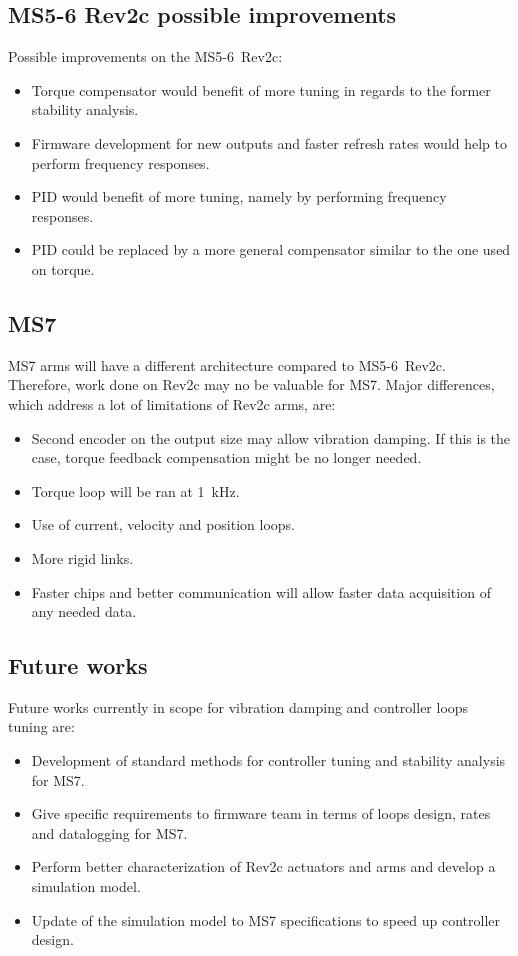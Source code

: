 \subsection{MS5-6 Rev2c possible improvements}
Possible improvements on the MS5-6~Rev2c:
\begin{itemize}
	\item Torque compensator would benefit of more tuning in regards to the former stability analysis.
	\item Firmware development for new outputs and faster refresh rates would help to perform frequency responses.
	\item PID would benefit of more tuning, namely by performing frequency responses.
	\item PID could be replaced by a more general compensator similar to the one used on torque.
\end{itemize} 

\subsection{MS7}
MS7 arms will have a different architecture compared to MS5-6~Rev2c. Therefore, work done on Rev2c may no be valuable for MS7. Major differences, which address a lot of limitations of Rev2c arms, are:
\begin{itemize}
	\item Second encoder on the output size may allow vibration damping. If this is the case, torque feedback compensation might be no longer needed.
	\item Torque loop will be ran at 1~kHz.
	\item Use of current, velocity and position loops.
	\item More rigid links.
	\item Faster chips and better communication will allow faster data acquisition of any needed data.
\end{itemize}


\subsection{Future works}
Future works currently in scope for vibration damping and controller loops tuning are: 
\begin{itemize}
	\item Development of standard methods for controller tuning and stability analysis for MS7.
	\item Give specific requirements to firmware team in terms of loops design, rates and datalogging for MS7.
	\item Perform better characterization of Rev2c actuators and arms and develop a simulation model.
	\item Update of the simulation model to MS7 specifications to speed up controller design.
\end{itemize}


